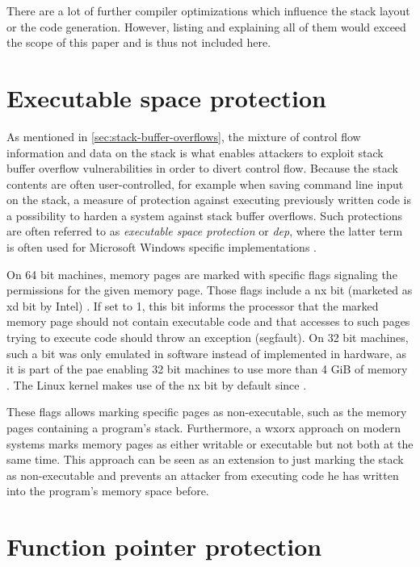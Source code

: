 There are a lot of further compiler optimizations which influence the stack layout or the code generation.
However, listing and explaining all of them would exceed the scope of this paper and is thus not included here.

\section{Executable space protection}
\label{sec:executable-space-protection}

As mentioned in \cref{sec:stack-buffer-overflows}, the mixture of control flow information and data on the stack is what enables attackers to exploit stack buffer overflow vulnerabilities in order to divert control flow.
Because the stack contents are often user-controlled, for example when saving command line input on the stack, a measure of protection against executing previously written code is a possibility to harden a system against stack buffer overflows.
Such protections are often referred to as \emph{executable space protection} or \emph{\gls{dep}}, where the latter term is often used for Microsoft Windows specific implementations \cite{Satran2018}.

On 64 bit machines, memory pages are marked with specific flags signaling the permissions for the given memory page.
Those flags include a \gls{nx} bit (marketed as \gls{xd} bit by Intel) \cite[801\psq]{Bryant2011}.
If set to 1, this bit informs the processor that the marked memory page should not contain executable code and that accesses to such pages trying to execute code should throw an exception (\acl{segfault}).
On 32 bit machines, such a bit was only emulated in software instead of implemented in hardware, as it is part of the \gls{pae} enabling 32 bit machines to use more than 4 GiB of memory \cite{Molnar2004}.
The Linux kernel makes use of the \gls{nx} bit by default since \citeyear{Cook2010} \cite{Cook2010}.

These flags allows marking specific pages as non-executable, such as the memory pages containing a program's stack.
Furthermore, a \gls{wxorx} approach on modern systems marks memory pages as either writable or executable but not both at the same time.
This approach can be seen as an extension to just marking the stack as non-executable and prevents an attacker from executing code he has written into the program's memory space before.

\section{Function pointer protection}
\label{sec:function-pointer-protection-current}

